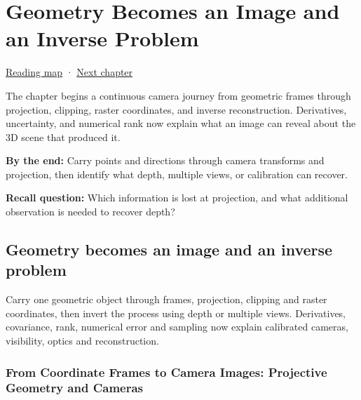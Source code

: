 \chapter{Geometry Becomes an Image and an Inverse Problem}\label{02-foundations-ii-ch032-geometry-becomes-an-image-and-an-inverse-problem}\hypertarget{02-foundations-ii-ch032}{}\label{stagechapter:02-foundations-ii-ch032}

\hypertarget{02-foundations-ii-ch032-geometry-becomes-an-image-and-an-inverse-problem}{}

\hyperref[volume-reading-map]{Reading map} · \hyperref[02-foundations-ii-ch033-projection-clipping-and-raster-sampling]{Next chapter}

The chapter begins a continuous camera journey from geometric frames through projection, clipping, raster coordinates, and inverse reconstruction. Derivatives, uncertainty, and numerical rank now explain what an image can reveal about the 3D scene that produced it.

\textbf{By the end:} Carry points and directions through camera transforms and projection, then identify what depth, multiple views, or calibration can recover.

\textbf{Recall question:} Which information is lost at projection, and what additional observation is needed to recover depth?

\section{Geometry becomes an image and an inverse problem}\label{02-foundations-ii-ch032-geometry-becomes-an-image-and-an-inverse-problem-1}

\hypertarget{02-foundations-ii-ch032-geometry-becomes-an-image-and-an-inverse-problem-1}{}

Carry one geometric object through frames, projection, clipping and raster coordinates, then invert the process using depth or multiple views. Derivatives, covariance, rank, numerical error and sampling now explain calibrated cameras, visibility, optics and reconstruction.

\subsection{From Coordinate Frames to Camera Images: Projective Geometry and Cameras}\label{02-foundations-ii-ch032-from-coordinate-frames-to-camera-images-projective-geometry-and-cameras}

\hypertarget{02-foundations-ii-ch032-from-coordinate-frames-to-camera-images-projective-geometry-and-cameras}{}

